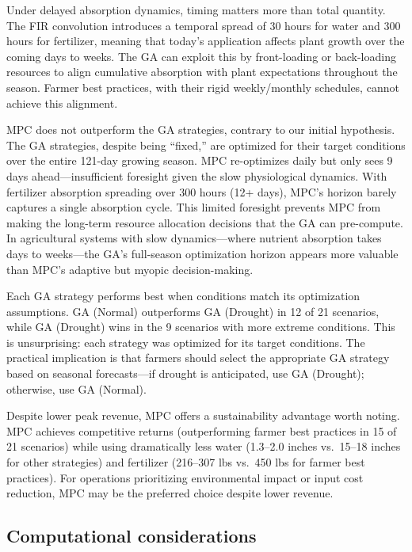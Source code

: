 \documentclass[preprint,12pt]{elsarticle}
\begin{document}
Under delayed absorption dynamics, timing matters more than total quantity. The FIR convolution introduces a temporal spread of 30 hours for water and 300 hours for fertilizer, meaning that today's application affects plant growth over the coming days to weeks. The GA can exploit this by front-loading or back-loading resources to align cumulative absorption with plant expectations throughout the season. Farmer best practices, with their rigid weekly/monthly schedules, cannot achieve this alignment.

MPC does not outperform the GA strategies, contrary to our initial hypothesis. The GA strategies, despite being ``fixed,'' are optimized for their target conditions over the entire 121-day growing season. MPC re-optimizes daily but only sees 9 days ahead---insufficient foresight given the slow physiological dynamics. With fertilizer absorption spreading over 300 hours (12+ days), MPC's horizon barely captures a single absorption cycle. This limited foresight prevents MPC from making the long-term resource allocation decisions that the GA can pre-compute. In agricultural systems with slow dynamics---where nutrient absorption takes days to weeks---the GA's full-season optimization horizon appears more valuable than MPC's adaptive but myopic decision-making.

Each GA strategy performs best when conditions match its optimization assumptions. GA (Normal) outperforms GA (Drought) in 12 of 21 scenarios, while GA (Drought) wins in the 9 scenarios with more extreme conditions. This is unsurprising: each strategy was optimized for its target conditions. The practical implication is that farmers should select the appropriate GA strategy based on seasonal forecasts---if drought is anticipated, use GA (Drought); otherwise, use GA (Normal).

Despite lower peak revenue, MPC offers a sustainability advantage worth noting. MPC achieves competitive returns (outperforming farmer best practices in 15 of 21 scenarios) while using dramatically less water (1.3--2.0 inches vs.\ 15--18 inches for other strategies) and fertilizer (216--307 lbs vs.\ 450 lbs for farmer best practices). For operations prioritizing environmental impact or input cost reduction, MPC may be the preferred choice despite lower revenue.

\subsection{Computational considerations}\label{subsec:compute}
\end{document}
